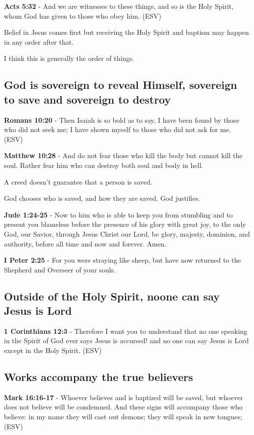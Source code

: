 \documentclass[11pt]{article}
\begin{document}
\textbf{Acts 5:32} - And we are witnesses to these things, and so is the Holy Spirit, whom God has given to those who obey him. (ESV)

Belief in Jesus comes first but receiving the Holy Spirit and baptism may happen in any order after that.

I think this is generally the order of things.

\subsection{God is sovereign to reveal Himself, sovereign to save and sovereign to destroy}
\label{sec:org2e804c3}

\textbf{Romans 10:20} - Then Isaiah is so bold as to say, I have been found by those who did not seek me; I have shown myself to those who did not ask for me. (ESV)

\textbf{Matthew 10:28} - And do not fear those who kill the body but cannot kill the soul. Rather fear him who can destroy both soul and body in hell.

A creed doesn't guarantee that a person is saved.

God chooses who is saved, and how they are saved.
God justifies.

\textbf{Jude 1:24-25} - Now to him who is able to keep you from stumbling and to present you blameless before the presence of his glory with great joy, to the only God, our Savior, through Jesus Christ our Lord, be glory, majesty, dominion, and authority, before all time and now and forever. Amen.

\textbf{I Peter 2:25} - For you were straying like sheep, but have now returned to the Shepherd and Overseer of your souls.

\subsection{Outside of the Holy Spirit, noone can say Jesus is Lord}
\label{sec:org0b6f60f}

\textbf{1 Corinthians 12:3} - Therefore I want you to understand that no one speaking in the Spirit of God ever says Jesus is accursed! and no one can say Jesus is Lord except in the Holy Spirit. (ESV)

\subsection{Works accompany the true believers}
\label{sec:org5be7dea}
\textbf{Mark 16:16-17} - Whoever believes and is baptized will be saved, but whoever does not believe will be condemned. And these signs will accompany those who believe: in my name they will cast out demons; they will speak in new tongues; (ESV)
\end{document}
